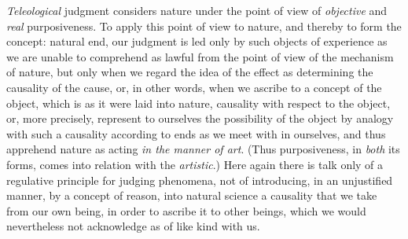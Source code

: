 \emph{Teleological} judgment considers nature under the point of view
of \emph{objective} and \emph{real} purposiveness. To apply this point
of view to nature, and thereby to form the concept: natural end, our
judgment is led only by such objects of experience as we are unable to
comprehend
as lawful from the point of view of the mechanism of nature, but only
when we regard the idea of the effect as determining the causality of
the cause, or, in other words, when we ascribe to a concept of the
object, which is as it were laid into nature, causality with respect to
the object, or, more precisely, represent to ourselves the possibility
of the object by analogy with such a causality according to ends as we
meet with in ourselves, and thus apprehend nature as acting \emph{in
the manner of art}. (Thus purposiveness, in \emph{both} its forms,
comes into relation with the \emph{artistic}.) Here again
there is talk only of a regulative principle for judging phenomena, not
of introducing, in an unjustified manner, by a concept of reason, into
natural science a causality that we take from our own being, in order
to ascribe it to other beings, which we would nevertheless not
acknowledge as of like kind with us.

